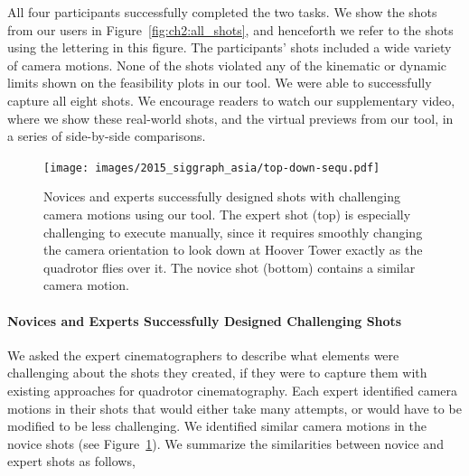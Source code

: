 All four participants successfully completed the two tasks.
We show the shots from our users in Figure~\ref{fig:ch2:all_shots}, and henceforth we refer to the shots using the lettering in this figure.
The participants' shots included a wide variety of camera motions.
None of the shots violated any of the kinematic or dynamic limits shown on the feasibility plots in our tool.
We were able to successfully capture all eight shots.
We encourage readers to watch our supplementary video, where we show these real-world shots, and the virtual previews from our tool, in a series of side-by-side comparisons.

\begin{figure}[t]
\centering
\texttt{[image: images/2015\_siggraph\_asia/top-down-sequ.pdf]}
\caption{
Novices and experts successfully designed shots with challenging camera motions using our tool.
The expert shot (top) is especially challenging to execute manually, since it requires smoothly changing the camera orientation to look down at Hoover Tower exactly as the quadrotor flies over it.
The novice shot (bottom) contains a similar camera motion.
}
\label{fig:ch2:expert_novice_comparison}
\end{figure}

\paragraph{Novices and Experts Successfully Designed Challenging Shots}
We asked the expert cinematographers to describe what elements were challenging about the shots they created, if they were to capture them with existing approaches for quadrotor cinematography.
Each expert identified camera motions in their shots that would either take many attempts, or would have to be modified to be less challenging.
We identified similar camera motions in the novice shots (see Figure~\ref{fig:ch2:expert_novice_comparison}).
We summarize the similarities between novice and expert shots as follows,

